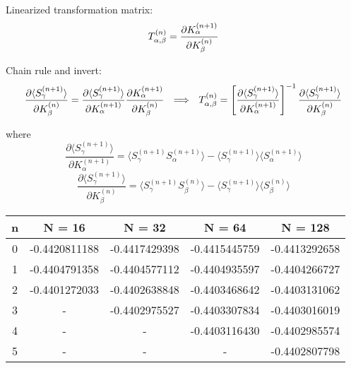 \documentclass[12pt]{article}
\begin{document}
Linearized transformation matrix:
\begin{equation}
T_{\alpha, \beta}^{(n)} = \frac{\partial K_\alpha^{(n+1)}}{\partial K_\beta^{(n)}}\\
\end{equation}

Chain rule and invert:
\begin{equation}
\frac{\partial \langle S_\gamma^{(n+1)} \rangle}{\partial K_\beta^{(n)}}
= \frac{\partial \langle S_\gamma^{(n+1)} \rangle}{\partial K_\alpha^{(n+1)}}
\frac{\partial K_\alpha^{(n+1)}}{\partial K_\beta^{(n)}} 
\ \ \Longrightarrow \ \ 
T_{\alpha, \beta}^{(n)} 
= \left[ \frac{\partial \langle S_\gamma^{(n+1)} \rangle}{\partial K_\alpha^{(n+1)}} \right]^{-1} \frac{\partial \langle S_\gamma^{(n+1)} \rangle}{\partial K_\beta^{(n)}} \\ 
\end{equation}

where
\begin{equation}
\frac{\partial \langle S_\gamma^{(n+1)} \rangle}{\partial K_\alpha^{(n+1)}}  
=  \Big\langle S_\gamma^{(n+1)} S_\alpha^{(n+1)} \Big\rangle
- \Big\langle S_\gamma^{(n+1)}  \Big\rangle 
\Big\langle  S_\alpha^{(n+1)}  \Big\rangle
\end{equation}
\begin{equation}
\frac{\partial \langle S_\gamma^{(n+1)} \rangle}{\partial K_\beta^{(n)}}  
=  \Big\langle S_\gamma^{(n+1)} S_\beta^{(n)} \Big\rangle
- \Big\langle S_\gamma^{(n+1)}  \Big\rangle 
\Big\langle  S_\beta^{(n)}  \Big\rangle
\end{equation}
\newpage

\begin{center}
\begin{tabular}{|c|c|c|c|c|}
\hline
n & N = 16 & N = 32 & N = 64 & N = 128\\
\hline
0 & -0.4420811188 & -0.4417429398& -0.4415445759 & -0.4413292658\\
1 & -0.4404791358 & -0.4404577112 & -0.4404935597& -0.4404266727\\
2 & -0.4401272033 & -0.4402638848 & -0.4403468642& -0.4403131062\\
3 & - & -0.4402975527& -0.4403307834 & -0.4403016019\\
4 & - &  -& -0.4403116430 &-0.4402985574 \\
5 & - &  -& -& -0.4402807798\\
\hline
\end{tabular}
\end{center}
\end{document}

